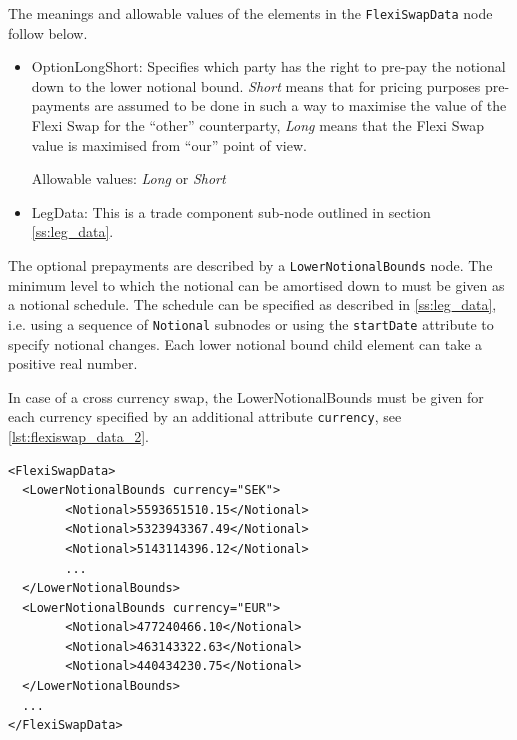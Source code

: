 The meanings and allowable values of the elements in the \lstinline!FlexiSwapData!  node follow below.

\begin{itemize}

\item OptionLongShort: Specifies which party has the right to pre-pay the notional down to the lower notional
  bound. \emph{Short} means that for pricing purposes pre-payments are assumed to be done in such a way to maximise the
  value of the Flexi Swap for the ``other'' counterparty, \emph{Long} means that the Flexi Swap value is maximised from
  ``our'' point of view.

Allowable values: \emph{Long} or \emph{Short}

\item LegData: This is a trade component sub-node outlined in section \ref{ss:leg_data}.

\end{itemize}

The optional prepayments are described by a \verb+LowerNotionalBounds+ node.  The minimum level to which the notional
can be amortised down to must be given as a notional schedule. The schedule can be specified as described in
\ref{ss:leg_data}, i.e. using a sequence of \verb+Notional+ subnodes or using the \verb+startDate+ attribute to specify
notional changes.  Each lower notional bound child element can take a positive real number.

In case of a cross currency swap, the LowerNotionalBounds must be given for each currency specified by an additional
attribute \verb+currency+, see \ref{lst:flexiswap_data_2}.

\begin{listing}[H]
\begin{verbatim}
<FlexiSwapData>
  <LowerNotionalBounds currency="SEK">
        <Notional>5593651510.15</Notional>
        <Notional>5323943367.49</Notional>
        <Notional>5143114396.12</Notional>
        ...
  </LowerNotionalBounds>
  <LowerNotionalBounds currency="EUR">
        <Notional>477240466.10</Notional>
        <Notional>463143322.63</Notional>
        <Notional>440434230.75</Notional>
  </LowerNotionalBounds>
  ...
</FlexiSwapData>
\end{verbatim}
\caption{Lower notional bounds for a SEK / EUR cross currency swap underlying}
\label{lst:flexiswap_data_2}
\end{listing}
